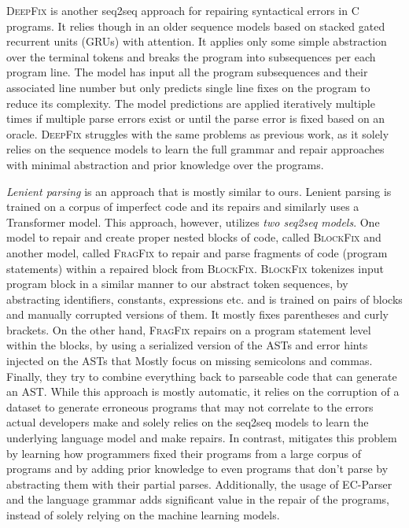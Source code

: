 \textsc{DeepFix} \citep{Gupta2017} is another seq2seq approach for repairing
syntactical errors in \textsc{C} programs. It relies though in an older sequence
models based on stacked gated recurrent units (GRUs) with attention. It applies
only some simple abstraction over the terminal tokens and breaks the program
into subsequences per each program line. The model has input all the program
subsequences and their associated line number but only predicts single line
fixes on the program to reduce its complexity. The model predictions are applied
iteratively multiple times if multiple parse errors exist or until the parse
error is fixed based on an oracle. \textsc{DeepFix} struggles with the same
problems as previous work, as it solely relies on the sequence models to learn
the full grammar and repair approaches with minimal abstraction and prior
knowledge over the programs.

\emph{Lenient parsing} \citep{Ahmed_2021} is an approach that is mostly similar
to ours. Lenient parsing is trained on a corpus of imperfect code and its
repairs and similarly uses a Transformer model. This approach, however, utilizes
\emph{two seq2seq models}. One model to repair and create proper nested blocks
of code, called \textsc{BlockFix} and another model, called \textsc{FragFix} to
repair and parse fragments of code (\eg program statements) within a repaired
block from \textsc{BlockFix}. \textsc{BlockFix} tokenizes input program block in
a similar manner to our abstract token sequences, by abstracting identifiers,
constants, expressions etc. and is trained on pairs of blocks and manually
corrupted versions of them. It mostly fixes parentheses and curly brackets. On
the other hand, \textsc{FragFix} repairs on a program statement level within the
blocks, by using a serialized version of the ASTs and error hints injected on
the ASTs that Mostly focus on missing semicolons and commas. Finally, they try
to combine everything back to parseable code that can generate an AST. While
this approach is mostly automatic, it relies on the corruption of a dataset to
generate erroneous programs that may not correlate to the errors actual
developers make and solely relies on the seq2seq models to learn the underlying
language model and make repairs. In contrast, \toolname mitigates this problem
by learning how programmers fixed their programs from a large corpus of programs
and by adding prior knowledge to even programs that don't parse by abstracting
them with their partial parses. Additionally, the usage of EC-Parser and the
language grammar adds significant value in the repair of the programs, instead
of solely relying on the machine learning models.
